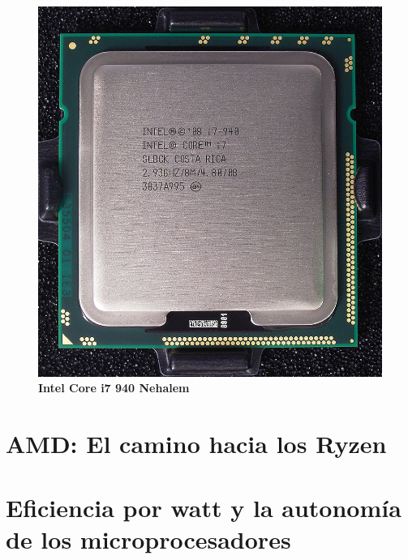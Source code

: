\begin{figure}[htb]
	\centering
	\includegraphics[scale = 0.2]{Graphics/800px-Intel_core_i7_940_top_R7309478_wp.jpg}
	\caption{\textbf{Intel Core i7 940 Nehalem}}
	\label{fig:25}
\end{figure}

\section{AMD: El camino hacia los Ryzen}
\section{Eficiencia por watt y la autonomía de los microprocesadores}
